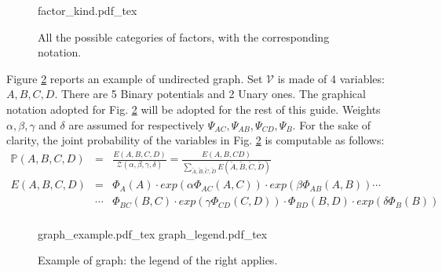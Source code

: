 \begin{figure}
	\centering
\def\svgwidth{0.95 \columnwidth}
{factor_kind.pdf_tex} 
	\caption{All the possible categories of factors, with the corresponding notation.}
	\label{fig:00:factor_kind}
\end{figure} 

Figure \ref{fig:00:example} reports an example of undirected graph. Set $\mathcal{V}$ is made of 4 variables: $A,B,C,D$. There are 5 Binary potentials and 2 Unary ones.
The graphical notation adopted for Fig. \ref{fig:00:example} will be adopted for the rest of this guide.
Weights $\alpha, \beta, \gamma$ and $\delta$ are assumed for respectively $\Psi _{AC}, \Psi _{AB}, \Psi _{CD}, \Psi _{B}$.
For the sake of clarity, the joint probability of the variables in Fig. \ref{fig:00:example} is computable as follows:
\begin{eqnarray}
\mathbb{P}(A,B,C,D) &=& \frac{E(A,B,C,D)}{\mathcal{Z}(\alpha, \beta, \gamma, \delta)} = 
\frac{E(A,B,CD)}{\sum_{\tilde{A}, \tilde{B}, \tilde{C}, \tilde{D}} E(\tilde{A}, \tilde{B}, \tilde{C}, \tilde{D})} \nonumber\\
E(A,B,C,D) &=& \Phi _{A}(A) \cdot exp(\alpha \Phi _{AC}(A,C))   \cdot exp(\beta \Phi _{AB}(A,B)) \cdots \nonumber\\
& \cdots &
\Phi _{BC}(B,C)  \cdot exp(\gamma \Phi _{CD}(C,D)) \cdot \Phi _{BD}(B,D)  \cdot exp(\delta \Phi _{B}(B))
\nonumber\\
\end{eqnarray}



\begin{figure}
	\centering
\def\svgwidth{0.4 \columnwidth}
{graph_example.pdf_tex} 
\quad
\def\svgwidth{0.3 \columnwidth}
{graph_legend.pdf_tex} 
	\caption{Example of graph: the legend of the right applies.}
	\label{fig:00:example}
\end{figure} 


